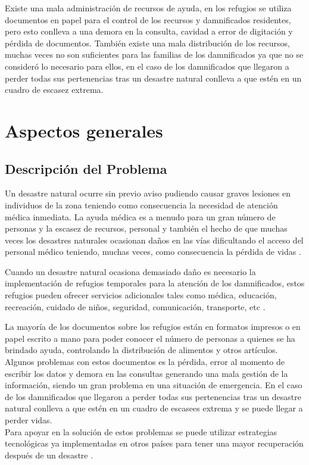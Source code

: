 \documentclass[11pt,openany]{book}
\newcounter{ns}
\begin{document}
	Existe una mala administración de recursos de ayuda, en los refugios se utiliza documentos en papel para el control de los recursos y damnificados residentes, pero esto conlleva a una demora en la consulta, cavidad a error de digitación y pérdida de documentos. También existe una mala distribución de los recursos, muchas veces no son suficientes para las familias de los damnificados ya que no se consideró lo necesario para ellos, en el caso de los damnificados que llegaron a perder todas sus pertenencias tras un desastre natural conlleva a que estén en un cuadro de escasez extrema.

	\chapter{Aspectos generales}
	\newpage

	\section{Descripción del Problema}

	Un desastre natural ocurre sin previo aviso pudiendo causar graves lesiones en individuos de la zona teniendo como consecuencia la necesidad de atención médica inmediata. La ayuda médica es a menudo para un gran número de personas y la escasez de recursos, personal y también el hecho de que muchas veces los desastres naturales ocasionan daños en las vías dificultando el acceso del personal médico teniendo, muchas veces, como consecuencia la pérdida de vidas \cite{Lupu2013}.

	Cuando un desastre natural ocasiona demasiado daño es necesario la implementación de refugios temporales para la atención de los damnificados, estos refugios pueden ofrecer servicios adicionales tales como médica, educación, recreación, cuidado de niños, seguridad, comunicación, transporte, etc \cite{CruzRoja}.

	La mayoría de los documentos sobre los refugios están en formatos impresos o en papel escrito a mano para poder conocer el número de personas a quienes se ha brindado ayuda, controlando la distribución de alimentos y otros artículos\cite{Wister2015}. Algunos problemas con estos documentos es la pérdida, error al momento de escribir los datos y demora en las consultas generando una mala gestión de la información, siendo un gran problema en una situación de emergencia. En el caso de los damnificados que llegaron a perder todas sus pertenencias tras un desastre natural conlleva a que estén en un cuadro de escasees extrema y se puede llegar a perder vidas.\\
	Para apoyar en la solución de estos problemas se puede utilizar estrategias tecnológicas ya implementadas en otros países para tener una mayor recuperación después de un desastre \cite{Wister2015,Wister2013,HernandezGoya2014,Al-Akkad}.
\end{document}
